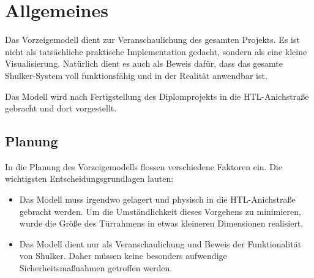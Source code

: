 \chapter{Allgemeines}
Das Vorzeigemodell dient zur Veranschaulichung des gesamten Projekts. Es ist nicht als tatsächliche
praktische Implementation gedacht, sondern als eine kleine Visualisierung. Natürlich dient es auch als Beweis dafür,
dass das gesamte Shulker-System voll funktionsfähig und in der Realität anwendbar ist.

Das Modell wird nach Fertigstellung des Diplomprojekts in die HTL-Anichstraße gebracht und dort vorgestellt.

\section{Planung}
In die Planung des Vorzeigemodells flossen verschiedene Faktoren ein. Die wichtigsten Entscheidungsgrundlagen lauten:

\begin{itemize}
    \item Das Modell muss irgendwo gelagert und physisch in die HTL-Anichstraße gebracht werden. Um die Umständlichkeit
    dieses Vorgehens zu minimieren, wurde die Größe des Türrahmens in etwas kleineren Dimensionen realisiert.

    \item Das Modell dient nur als Veranschaulichung und Beweis der Funktionalität von Shulker. Daher müssen keine besonders aufwendige
    Sicherheitsmaßnahmen getroffen werden.
\end{itemize}